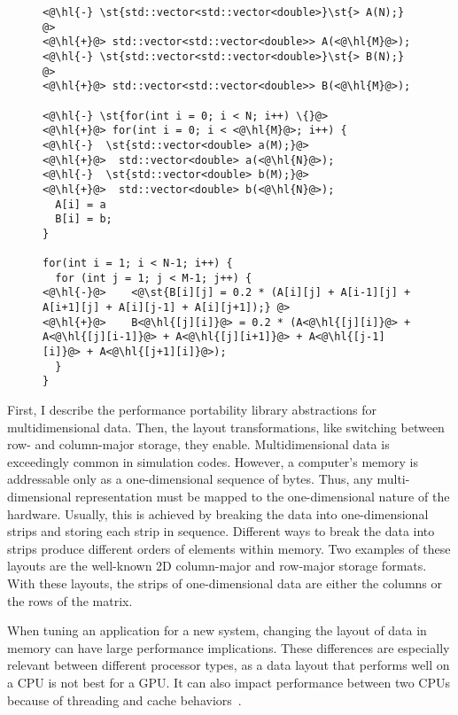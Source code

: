 \begin{figure}
\begin{lstlisting}[caption={Code changes required to switch from row- to column-major order in the C++ implementation of the 5 point stencil.},label=stencilCppColumn]
<@\hl{-} \st{std::vector<std::vector<double>}\st{> A(N);} @>
<@\hl{+}@> std::vector<std::vector<double>> A(<@\hl{M}@>);
<@\hl{-} \st{std::vector<std::vector<double>}\st{> B(N);} @>
<@\hl{+}@> std::vector<std::vector<double>> B(<@\hl{M}@>);

<@\hl{-} \st{for(int i = 0; i < N; i++) \{}@>
<@\hl{+}@> for(int i = 0; i < <@\hl{M}@>; i++) {
<@\hl{-}  \st{std::vector<double> a(M);}@>
<@\hl{+}@>  std::vector<double> a(<@\hl{N}@>);
<@\hl{-}  \st{std::vector<double> b(M);}@>
<@\hl{+}@>  std::vector<double> b(<@\hl{N}@>);
  A[i] = a
  B[i] = b;
}

for(int i = 1; i < N-1; i++) {
  for (int j = 1; j < M-1; j++) {
<@\hl{-}@>    <@\st{B[i][j] = 0.2 * (A[i][j] + A[i-1][j] + A[i+1][j] + A[i][j-1] + A[i][j+1]);} @>
<@\hl{+}@>    B<@\hl{[j][i]}@> = 0.2 * (A<@\hl{[j][i]}@> + A<@\hl{[j][i-1]}@> + A<@\hl{[j][i+1]}@> + A<@\hl{[j-1][i]}@> + A<@\hl{[j+1][i]}@>);
  }
}
\end{lstlisting}
\end{figure}

First, I describe the performance portability library abstractions for multidimensional data.
Then, the layout transformations, like switching between row- and column-major storage, they enable.
Multidimensional data is exceedingly common in simulation codes.
However, a computer's memory is addressable only as a one-dimensional sequence of bytes.
Thus, any multi-dimensional representation must be mapped to the one-dimensional nature of the hardware.
Usually, this is achieved by breaking the data into one-dimensional strips and storing each strip in sequence.
Different ways to break the data into strips produce different orders of elements within memory.
Two examples of these layouts are the well-known 2D column-major and row-major storage formats.
With these layouts, the strips of one-dimensional data are either the columns or the rows of the matrix.

When tuning an application for a new system, changing the layout of data in memory can have large performance implications.
These differences are especially relevant between different processor types, as a data layout that performs well on a CPU is not best for a GPU\@.
It can also impact performance between two CPUs because of threading and cache behaviors~\cite{trott2021kokkos}.

